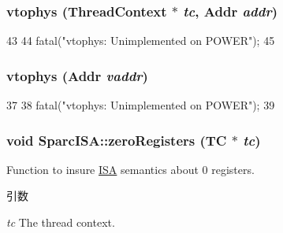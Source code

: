 \hypertarget{namespaceSparcISA_af1014ad6d87b8a97e9d660234574a565}{
\subsubsection[{vtophys}]{ vtophys ({\bf ThreadContext} $\ast$ {\em tc}, \/  {\bf Addr} {\em addr})}}
\label{namespaceSparcISA_af1014ad6d87b8a97e9d660234574a565}



\begin{DoxyCode}
43 {
44     fatal("vtophys: Unimplemented on POWER\n");
45 }
\end{DoxyCode}
\hypertarget{namespaceSparcISA_a3828815371ad2b0a1be60abdcb405cf9}{
\subsubsection[{vtophys}]{ vtophys ({\bf Addr} {\em vaddr})}}
\label{namespaceSparcISA_a3828815371ad2b0a1be60abdcb405cf9}



\begin{DoxyCode}
37 {
38     fatal("vtophys: Unimplemented on POWER\n");
39 }
\end{DoxyCode}
\hypertarget{namespaceSparcISA_a97e4061eeb8177ba68cd308488877c2c}{
\subsubsection[{zeroRegisters}]{\setlength{\rightskip}{0pt plus 5cm}void SparcISA::zeroRegisters (TC $\ast$ {\em tc})}}
\label{namespaceSparcISA_a97e4061eeb8177ba68cd308488877c2c}
Function to insure \hyperlink{classSparcISA_1_1ISA}{ISA} semantics about 0 registers. 
\begin{DoxyParams}{引数}
\item[{\em tc}]The thread context. \end{DoxyParams}


